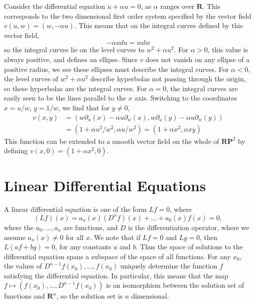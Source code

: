 \begin{example}
    Consider the differential equation $\ddot{u} + \alpha u = 0$, as $\alpha$ ranges over $\mathbf{R}$. This corresponds to the two dimensional first order system specified by the vector field $v(u,w) = (w, -\alpha u)$. This means that on the integral curves defined by this vector field,
    \[ - \alpha u du = w dw \]
    so the integral curves lie on the level curves to $w^2 + \alpha u^2$. For $\alpha > 0$, this value is always positive, and defines an ellipse. Since $v$ does not vanish on any ellipse of a positive radius, we see these ellipses must describe the integral curves. For $\alpha < 0$, the level curves of $w^2 + \alpha u^2$ describe hyperbolas not passing through the origin, so these hyperbolas are the integral curves. For $\alpha = 0$, the integral curves are easily seen to be the lines parallel to the $x$ axis. Switching to the coordinates $x = u/w$, $y = 1/w$, we find that for $y \neq 0$,
    \begin{align*}
        v(x,y) &= (w \partial_u(x) - \alpha u \partial_w(x), w \partial_u(y) - \alpha u \partial_w(y))\\
        &= (1 + \alpha u^2/w^2, \alpha u/w^2) = (1 + \alpha x^2, \alpha xy)
    \end{align*}
    This function can be extended to a smooth vector field on the whole of $\mathbf{RP}^2$ by defining $v(x,0) = (1 + \alpha x^2,0)$.
\end{example}

\chapter{Linear Differential Equations}

A linear differential equation is one of the form $Lf = 0$, where
%
\[ (Lf)(x) = a_n(x) (D^n f)(x) + \dots + a_0(x) f(x) = 0, \]
%
where the $a_0, \dots, a_n$ are functions, and $D$ is the differentiation operator, where we assume $a_n(x) \neq 0$ for all $x$. We note that if $Lf = 0$ and $Lg = 0$, then $L(af + bg) = 0$, for any constants $a$ and $b$. Thus the space of solutions to the differential equation spans a subspace of the space of all functions. For any $x_0$, the values of $D^{n-1}f(x_0), \dots, f(x_0)$ uniquely determine the function $f$ satisfying the differential equation. In particular, this means that the map $f \mapsto (f(x_0), \dots, D^{n-1}f(x_0))$ is an isomorphism between the solution set of functions and $\mathbf{R}^n$, so the solution set is $n$ dimensional.

